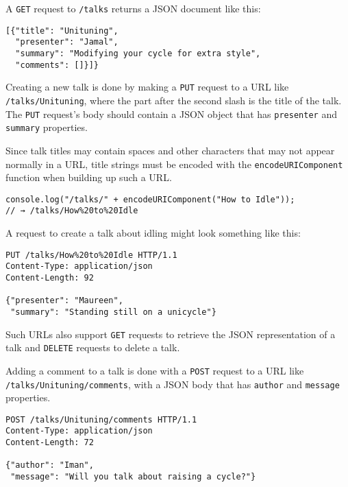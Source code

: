 A \lstinline`GET` request to \lstinline`/talks` returns a JSON document like this:

\begin{lstlisting}
[{"title": "Unituning",
  "presenter": "Jamal",
  "summary": "Modifying your cycle for extra style",
  "comments": []}]}
\end{lstlisting}
\noindent{}

Creating a new talk is done by making a \lstinline`PUT` request to a URL like \lstinline`/talks/Unituning`, where the part after the second slash is the title of the talk. The \lstinline`PUT` request's body should contain a JSON object that has \lstinline`presenter` and \lstinline`summary` properties.

Since talk titles may contain spaces and other characters that may not appear normally in a URL, title strings must be encoded with the \lstinline`encodeURIComponent` function when building up such a URL.

\begin{lstlisting}
console.log("/talks/" + encodeURIComponent("How to Idle"));
// → /talks/How%20to%20Idle
\end{lstlisting}
\noindent

A request to create a talk about idling might look something like this:

\begin{lstlisting}
PUT /talks/How%20to%20Idle HTTP/1.1
Content-Type: application/json
Content-Length: 92

{"presenter": "Maureen",
 "summary": "Standing still on a unicycle"}
\end{lstlisting}
\noindent

Such URLs also support \lstinline`GET` requests to retrieve the JSON representation of a talk and \lstinline`DELETE` requests to delete a talk.

Adding a comment to a talk is done with a \lstinline`POST` request to a URL like \lstinline`/talks/Unituning/comments`, with a JSON body that has \lstinline`author` and \lstinline`message` properties.

\begin{lstlisting}
POST /talks/Unituning/comments HTTP/1.1
Content-Type: application/json
Content-Length: 72

{"author": "Iman",
 "message": "Will you talk about raising a cycle?"}
\end{lstlisting}
\noindent{}

